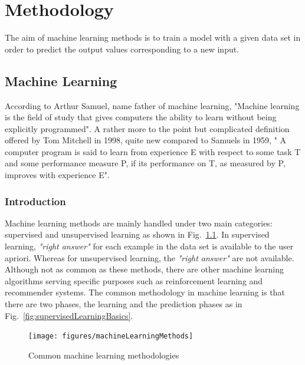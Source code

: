\chapter{Methodology}

The aim of machine learning methods is to train a model with a given data set in order to predict the output values corresponding to a new input. 

\section{Machine Learning}

According to Arthur Samuel, name father of machine learning, "Machine learning is the field of study that gives computers the ability to learn without being explicitly programmed". 
A rather more to the point but complicated definition offered by Tom Mitchell in 1998, quite new compared to Samuel\textquotesingle s in 1959, " A computer program is said to learn from experience E with respect to some task T and some performance measure P, if its performance on T, as measured by P, improves with experience E".

\subsection{Introduction}
Machine learning methods are mainly handled under two main categories: supervised and unsupervised learning as shown in Fig.~\ref{fig:machineLearningMethods}. 
In supervised learning, \textit{"right answer"} for each example in the data set is available to the user apriori. 
Whereas for unsupervised learning, the \textit{"right answer"} are not available. 
Although not as common as these methods, there are other machine learning algorithms serving specific purposes such as reinforcement learning and recommender systems. 
The common methodology in machine learning is that there are two phases, the learning and the prediction phases as in Fig.~\ref{fig:supervisedLearningBasics}. 

\begin{figure}
\begin{center}
\texttt{[image: figures/machineLearningMethods]}    %
\caption{Common machine learning methodologies} 
\label{fig:machineLearningMethods}
\end{center}
\end{figure}

